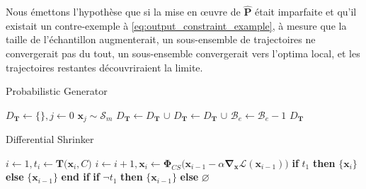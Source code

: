 Nous émettons l'hypothèse que si la mise en œuvre de $\mathbf{\hat P}$ était imparfaite et qu'il existait un contre-exemple à \autoref{eq:output_constraint_example}, à mesure que la taille de l'échantillon augmenterait, un sous-ensemble de trajectoires ne convergerait pas du tout, un sous-ensemble convergerait vers l'optima local, et les trajectoires restantes découvriraient la limite.

\begin{algorithm}[ht]
\caption{Probabilistic Generator}
\label{alg:prob_adversary}
\begin{algorithmic}[1]
\State $D_\mathbf T \gets \{\}, j \gets 0$
\State $\mathbf{x}_j \sim \mathcal S_m$
 
\State $D_\mathbf T \gets D_\mathbf T$ $\cup$ 
\Else {}
\State $D_\mathbf T \gets D_\mathbf T$ $\cup$  
\EndIf
\State $\mathcal{B}_e \gets \mathcal{B}_e - 1$
\EndWhile
\State \Return $D_\mathbf T$
\EndProcedure
\end{algorithmic}
\end{algorithm}

\begin{algorithm}[ht]
\caption{Differential Shrinker}
\label{alg:diff_adversary}
\begin{algorithmic}[1]
\State $i \gets 1, t_i \gets \mathbf T\big(\mathbf x_i, C\big)$ 
\Do
    \State $i \gets i + 1, \mathbf x_i \gets \bm\Phi_{CS}\big(\mathbf x_{i-1} - \alpha\mathbf\nabla_{\mathbf x} \mathcal{L}(\mathbf{x}_{i-1})\big)$ 
     
    \State \Return \textbf{if } $t_1$ \textbf{ then } $\{\mathbf{x}_{i}\}$ \textbf{ else } $\{\mathbf{x}_{i-1}\}$ \textbf{ end if} 
    \EndIf
{} 
\State \Return \textbf{if } $\neg t_1$ \textbf{ then } $\{\mathbf x_{i-1}\}$ \textbf{ else } $\varnothing$ 
\EndProcedure
\end{algorithmic}
\end{algorithm}


